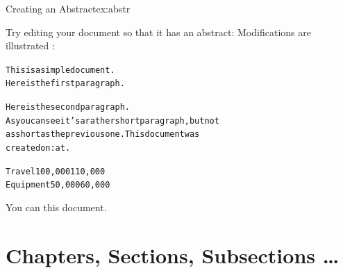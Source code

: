 \begin{exercise}{Creating an Abstract}{ex:abstr}

Try editing your document so that it has an abstract:
Modifications are illustrated :

\begin{bcode}
\begin{alltt}
\oarg{12pt}






This is a simple document.
Here is the first paragraph.

Here is the second paragraph.
As you can see it's a rather short paragraph, but not
as short as the previous one. This document was
created on: at .

  
    
 Travel  100,000  110,000
 Equipment  50,000  60,000


\end{alltt}
\end{bcode}

You can  this document.
\end{exercise}


\section{Chapters, Sections, Subsections \ldots}
\label{sec:section}

